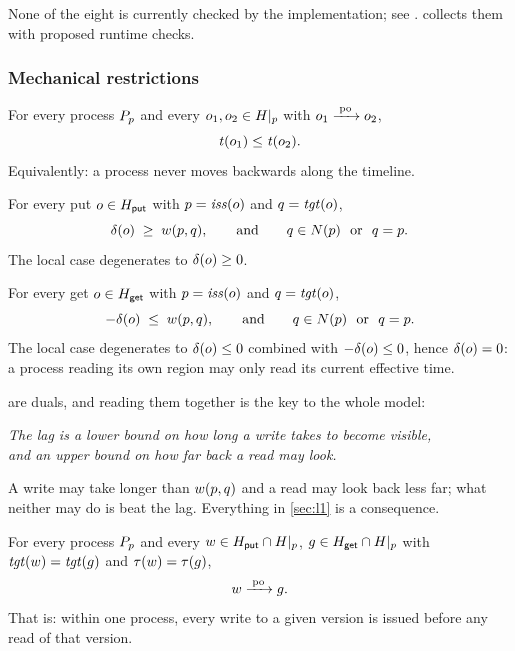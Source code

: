 None of the eight is currently checked by the implementation; see
. 
collects them with proposed runtime checks.

\subsubsection*{Mechanical restrictions}

\begin{restr}\label{res:monotone}
For every process $P_{p}$ and every $o_1, o_2 \in H|_p$ with $o_1 \xrightarrow{\;\mathrm{po}\;} o_2$,
\[
  \mathit{t}(o_1) \le \mathit{t}(o_2).
\]
Equivalently: a process never moves backwards along the timeline.
\end{restr}

\begin{restr}[Lookahead]\label{res:lookahead}
For every put $o \in H_{\mathsf{put}}$ with $p = \mathit{iss}(o)$ and
$q = \mathit{tgt}(o)$,
\[
  \delta(o) \;\ge\; w(p,q),
  \qquad\text{and}\qquad
  q \in N(p) \ \text{ or }\ q = p .
\]
The local case degenerates to $\delta(o) \ge 0$.
\end{restr}

\begin{restr}\label{res:staleness}
For every get $o \in H_{\mathsf{get}}$ with $p = \mathit{iss}(o)$ and
$q = \mathit{tgt}(o)$,
\[
  -\delta(o) \;\le\; w(p,q),
  \qquad\text{and}\qquad
  q \in N(p) \ \text{ or }\ q = p .
\]
The local case degenerates to $\delta(o) \le 0$ combined with
$-\delta(o) \le 0$, hence $\delta(o) = 0$: a process reading its own \gls{region}
may only read its current effective time.
\end{restr}

 are duals, and reading them together is the
key to the whole model:

\begin{center}
\emph{The \gls{lag} is a lower bound on how long a write takes to
become visible,\\ and an upper bound on how far back a read may look.}
\end{center}

A write may take longer than $w(p,q)$ and a read may look back less far;
what neither may do is beat the lag. Everything in \cref{sec:l1} is a
consequence.

\begin{restr}\label{res:phase}
For every process $P_{p}$ and every $w \in H_{\mathsf{put}} \cap H|_p$,
$g \in H_{\mathsf{get}} \cap H|_p$ with
$\mathit{tgt}(w) = \mathit{tgt}(g)$ and $\tau(w) = \tau(g)$,
\[
  w \xrightarrow{\;\mathrm{po}\;} g .
\]
That is: within one process, every write to a given version is issued before any
read of that version. 
\end{restr}

